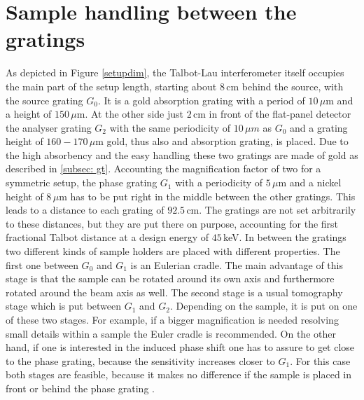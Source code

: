 \section[Sample handling]{Sample handling between the gratings}\label{sec:samplehandling}
As depicted in Figure \ref{setupdim}, the Talbot-Lau interferometer itself occupies the main part of the setup length, starting about $8\,$cm behind the source, with the source grating $G_{0}$. It is a gold absorption grating with a period of $10\,\mu$m and a height of $150\,\mu$m. At the other side just $2\,$cm in front of the flat-panel detector the analyser grating $G_{2}$ with the same periodicity of $10\,\mu m$ as $G_{0}$ and a grating height of $160-170\,\mu$m gold, thus also and absorption grating, is placed. Due to the high absorbency and the easy handling these two gratings are made of gold as described in \ref{subsec: gt}. Accounting the magnification factor of two for a symmetric setup, the phase grating $G_{1}$ with a periodicity of $5\,\mu$m and a nickel height of $8\,\mu$m has to be put right in the middle between the other gratings. This leads to a distance to each grating of $92.5\, $cm. The gratings are not set arbitrarily to these distances, but they are put there on purpose, accounting for the first fractional Talbot distance at a design energy of $45\,$keV. In between the gratings two different kinds of sample holders are placed with different properties. The first one between $G_{0}$ and $G_{1}$ is an Eulerian cradle. The main advantage of this stage is that the sample can be rotated around its own axis and furthermore rotated around the beam axis as well. The second stage is a usual tomography stage which is put between $G_{1}$ and $G_{2}$. Depending on the sample, it is put on one of these two stages. For example, if a bigger magnification is needed resolving small details within a sample the Euler cradle is recommended. On the other hand, if one is interested in the induced phase shift one has to assure to get close to the phase grating, because the sensitivity increases closer to $G_{1}$. For this case both stages are feasible, because it makes no difference if the sample is placed in front or behind the phase grating \citep{Yashiro2008}. 
